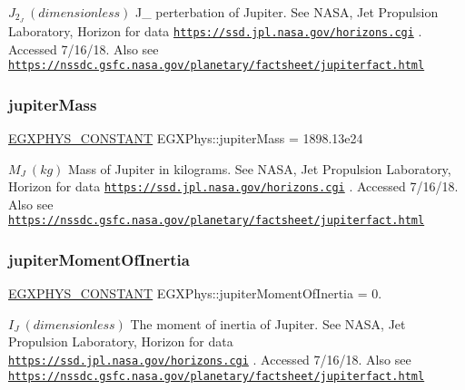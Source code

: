 $ J_{2}_{J} \ (dimensionless)$ J\+\_ perterbation of Jupiter. See N\+A\+SA, Jet Propulsion Laboratory, Horizon for data \href{https://ssd.jpl.nasa.gov/horizons.cgi}{\tt https\+://ssd.\+jpl.\+nasa.\+gov/horizons.\+cgi} . Accessed 7/16/18. Also see \href{https://nssdc.gsfc.nasa.gov/planetary/factsheet/jupiterfact.html}{\tt https\+://nssdc.\+gsfc.\+nasa.\+gov/planetary/factsheet/jupiterfact.\+html} \mbox{\label{group___e_g_x_phys-_constants-_astrophysics-_solar_system-_jupiter-_bulk_ga8a78b1db0a9c538857855b43a3bc47e6}} 
\subsubsection{\texorpdfstring{jupiter\+Mass}{jupiterMass}}
{\footnotesize\ttfamily \mbox{\hyperlink{group___e_g_x_phys-_constants-_macros_ga76980d288494ce1714c9ac68a95ba702}{E\+G\+X\+P\+H\+Y\+S\+\_\+\+C\+O\+N\+S\+T\+A\+NT}} E\+G\+X\+Phys\+::jupiter\+Mass = 1898.\+13e24}

$M_{J} \ (kg)$ Mass of Jupiter in kilograms. See N\+A\+SA, Jet Propulsion Laboratory, Horizon for data \href{https://ssd.jpl.nasa.gov/horizons.cgi}{\tt https\+://ssd.\+jpl.\+nasa.\+gov/horizons.\+cgi} . Accessed 7/16/18. Also see \href{https://nssdc.gsfc.nasa.gov/planetary/factsheet/jupiterfact.html}{\tt https\+://nssdc.\+gsfc.\+nasa.\+gov/planetary/factsheet/jupiterfact.\+html} \mbox{\label{group___e_g_x_phys-_constants-_astrophysics-_solar_system-_jupiter-_bulk_ga50587ad8262cc8af606d31ba2cc00e37}} 
\subsubsection{\texorpdfstring{jupiter\+Moment\+Of\+Inertia}{jupiterMomentOfInertia}}
{\footnotesize\ttfamily \mbox{\hyperlink{group___e_g_x_phys-_constants-_macros_ga76980d288494ce1714c9ac68a95ba702}{E\+G\+X\+P\+H\+Y\+S\+\_\+\+C\+O\+N\+S\+T\+A\+NT}} E\+G\+X\+Phys\+::jupiter\+Moment\+Of\+Inertia = 0.}

$ I_{J} \ (dimensionless)$ The moment of inertia of Jupiter. See N\+A\+SA, Jet Propulsion Laboratory, Horizon for data \href{https://ssd.jpl.nasa.gov/horizons.cgi}{\tt https\+://ssd.\+jpl.\+nasa.\+gov/horizons.\+cgi} . Accessed 7/16/18. Also see \href{https://nssdc.gsfc.nasa.gov/planetary/factsheet/jupiterfact.html}{\tt https\+://nssdc.\+gsfc.\+nasa.\+gov/planetary/factsheet/jupiterfact.\+html} \mbox{\label{group___e_g_x_phys-_constants-_astrophysics-_solar_system-_jupiter-_bulk_gae10498fbbb0666a828130575ffc28d6e}} 
